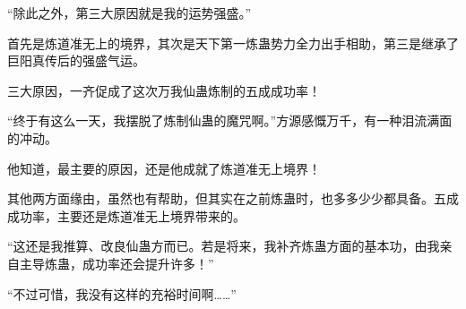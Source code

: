 \begin{this_body}
“除此之外，第三大原因就是我的运势强盛。”

首先是炼道准无上的境界，其次是天下第一炼蛊势力全力出手相助，第三是继承了巨阳真传后的强盛气运。

三大原因，一齐促成了这次万我仙蛊炼制的五成成功率！

“终于有这么一天，我摆脱了炼制仙蛊的魔咒啊。”方源感慨万千，有一种泪流满面的冲动。

他知道，最主要的原因，还是他成就了炼道准无上境界！

其他两方面缘由，虽然也有帮助，但其实在之前炼蛊时，也多多少少都具备。五成成功率，主要还是炼道准无上境界带来的。

“这还是我推算、改良仙蛊方而已。若是将来，我补齐炼蛊方面的基本功，由我亲自主导炼蛊，成功率还会提升许多！”

“不过可惜，我没有这样的充裕时间啊……”

\end{this_body}

